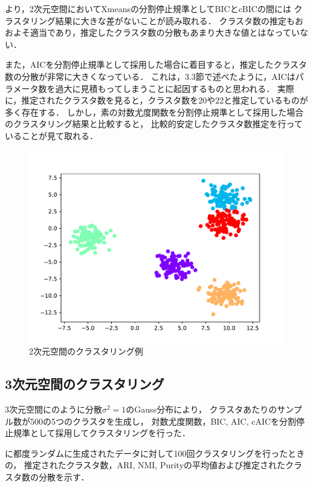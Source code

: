 より，2次元空間においてXmeansの分割停止規準としてBICとcBICの間には
クラスタリング結果に大きな差がないことが読み取れる．
クラスタ数の推定もおおよそ適当であり，推定したクラスタ数の分散もあまり大きな値とはなっていない．

また，AICを分割停止規準として採用した場合に着目すると，推定したクラスタ数の分散が非常に大きくなっている．
これは，3.3節で述べたように，AICはパラメータ数を過大に見積もってしまうことに起因するものと思われる．
実際に，推定されたクラスタ数を見ると，クラスタ数を20や22と推定しているものが多く存在する．
しかし，素の対数尤度関数を分割停止規準として採用した場合のクラスタリング結果と比較すると，
比較的安定したクラスタ数推定を行っていることが見て取れる．

\begin{figure}[htbp]
  \begin{center}
    \includegraphics[width=0.7\linewidth]{./img/BIC_2.pdf}
      \caption{2次元空間のクラスタリング例}
      \label{fig:2dim}
  \end{center}
\end{figure}

\subsection{3次元空間のクラスタリング}

3次元空間にのように分散$\sigma^2=1$のGauss分布により，
クラスタあたりのサンプル数が500の5つのクラスタを生成し，
対数尤度関数，BIC, AIC, cAICを分割停止規準として採用してクラスタリングを行った．

に都度ランダムに生成されたデータに対して100回クラスタリングを行ったときの，
推定されたクラスタ数，ARI, NMI, Purityの平均値および推定されたクラスタ数の分散を示す．

